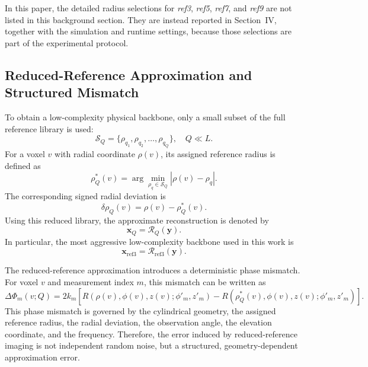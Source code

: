 \documentclass[journal]{IEEEtran}
\begin{document}
In this paper, the detailed radius selections for \emph{ref3}, \emph{ref5}, \emph{ref7}, and \emph{ref9} are not listed in this background section. They are instead reported in Section~IV, together with the simulation and runtime settings, because those selections are part of the experimental protocol.

\subsection{Reduced-Reference Approximation and Structured Mismatch}
\label{subsec:structured_mismatch}

To obtain a low-complexity physical backbone, only a small subset of the full reference library is used:
\begin{equation}
\mathcal{S}_{Q}=\{\rho_{q_1},\rho_{q_2},\ldots,\rho_{q_Q}\},\quad Q\ll L.
\label{eq:reduced_library}
\end{equation}
For a voxel \(v\) with radial coordinate \(\rho(v)\), its assigned reference radius is defined as
\begin{equation}
 \rho_Q^{\ast}(v)=
 \arg\min_{\rho_q\in\mathcal{S}_{Q}} |\rho(v)-\rho_q|.
\label{eq:assigned_reference}
\end{equation}
The corresponding signed radial deviation is
\begin{equation}
 \delta\rho_Q(v)=\rho(v)-\rho_Q^{\ast}(v).
\label{eq:radial_deviation}
\end{equation}
Using this reduced library, the approximate reconstruction is denoted by
\begin{equation}
 \mathbf{x}_{Q}=\mathcal{R}_{Q}(\mathbf{y}).
\label{eq:reduced_reconstruction}
\end{equation}
In particular, the most aggressive low-complexity backbone used in this work is
\begin{equation}
 \mathbf{x}_{\mathrm{ref3}}=\mathcal{R}_{\mathrm{ref3}}(\mathbf{y}).
\label{eq:ref3_reconstruction}
\end{equation}

The reduced-reference approximation introduces a deterministic phase mismatch. For voxel \(v\) and measurement index \(m\), this mismatch can be written as
\begin{equation}
\Delta\Phi_m(v;Q)=
2k_m\left[
R(\rho(v),\phi(v),z(v);\phi'_m,z'_m)
-
R(\rho_Q^{\ast}(v),\phi(v),z(v);\phi'_m,z'_m)
\right].
\label{eq:phase_error}
\end{equation}
This phase mismatch is governed by the cylindrical geometry, the assigned reference radius, the radial deviation, the observation angle, the elevation coordinate, and the frequency. Therefore, the error induced by reduced-reference imaging is not independent random noise, but a structured, geometry-dependent approximation error.
\end{document}
